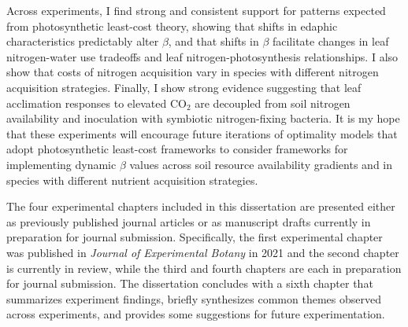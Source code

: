 Across experiments, I find strong and consistent support for patterns expected from photosynthetic least-cost theory, showing that shifts in edaphic characteristics predictably alter $\beta$, and that shifts in $\beta$ facilitate changes in leaf nitrogen-water use tradeoffs and leaf nitrogen-photosynthesis relationships. I also show that costs of nitrogen acquisition vary in species with different nitrogen acquisition strategies. Finally, I show strong evidence suggesting that leaf acclimation responses to elevated CO$_2$ are decoupled from soil nitrogen availability and inoculation with symbiotic nitrogen-fixing bacteria. It is my hope that these experiments will encourage future iterations of optimality models that adopt photosynthetic least-cost frameworks to consider frameworks for implementing dynamic $\beta$ values across soil resource availability gradients and in species with different nutrient acquisition strategies.

The four experimental chapters included in this dissertation are presented either as previously published journal articles or as manuscript drafts currently in preparation for journal submission. Specifically, the first experimental chapter was published in \textit{Journal of Experimental Botany} in 2021 and the second chapter is currently in review, while the third and fourth chapters are each in preparation for journal submission. The dissertation concludes with a sixth chapter that summarizes experiment findings, briefly synthesizes common themes observed across experiments, and provides some suggestions for future experimentation.